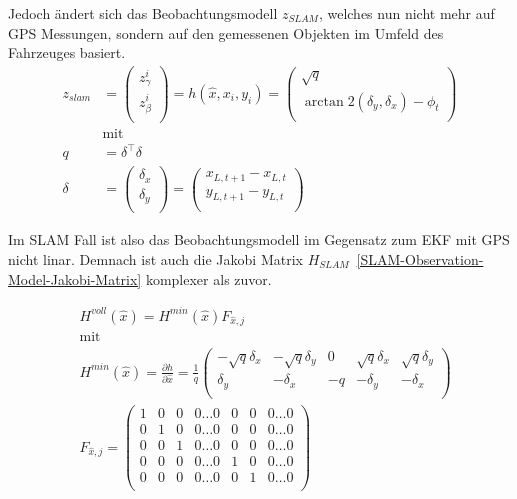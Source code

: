 \documentclass[11pt]{article}
\begin{document}
Jedoch ändert sich das Beobachtungsmodell $z_{SLAM}$, welches nun nicht mehr auf GPS Messungen, sondern auf den gemessenen Objekten im Umfeld des Fahrzeuges basiert.
\begin{equation}\label{SLAM-Observation-Model}
\begin{split}
	z_{slam} &= \begin{pmatrix}
		z_\gamma^i \\
		z_\beta^i \\
	\end{pmatrix} = h(\hat{x}, x_i, y_i) = \begin{pmatrix}
		\sqrt{q} \\
		\arctan 2(\delta_y, \delta_x) - \phi_t \\
	\end{pmatrix}\\
	&\text{mit} \\
	q &= \delta^\intercal \delta \\
	\delta &= \begin{pmatrix}
		\delta_x \\
		\delta_y \\
	\end{pmatrix} = \begin{pmatrix}
		x_{L, t+1} - x_{L, t}  \\
		y_{L, t+1}  - y_{L, t} \\
	\end{pmatrix}
\end{split}
\end{equation}

Im SLAM Fall ist also das Beobachtungsmodell im Gegensatz zum EKF mit GPS nicht linar. Demnach ist auch die Jakobi Matrix $H_{SLAM}$~\ref{SLAM-Observation-Model-Jakobi-Matrix} komplexer als zuvor.

\begin{equation}\label{SLAM-Observation-Model-Jakobi-Matrix}
\begin{split}
	&H^{voll}(\hat{x}) = H^{min}(\hat{x})F_{\hat{x},j} \\
	&\text{mit} \\
	&H^{min}(\hat{x}) = \frac{\partial h}{\partial \hat{x}} = \frac{1}{q} \begin{pmatrix}
		-\sqrt{q}\delta_x & -\sqrt{q}\delta_y & 0 & \sqrt{q}\delta_x & \sqrt{q}\delta_y \\
		\delta_y & -\delta_x & -q & -\delta_y & -\delta_x\\
	\end{pmatrix} \\
	&F_{\hat{x},j} = \begin{pmatrix}
		1 & 0 & 0 & 0 \dots 0 & 0 & 0 & 0 \dots 0 \\
		0 & 1 & 0 & 0 \dots 0 & 0 & 0 & 0 \dots 0 \\
		0 & 0 & 1 & 0 \dots 0 & 0 & 0 & 0 \dots 0 \\
		0 & 0 & 0 & 0 \dots 0 & 1 & 0 & 0 \dots 0 \\
		0 & 0 & 0 & 0 \dots 0 & 0 & 1 & 0 \dots 0 \\
	\end{pmatrix}
\end{split}
\end{equation}
\end{document}
